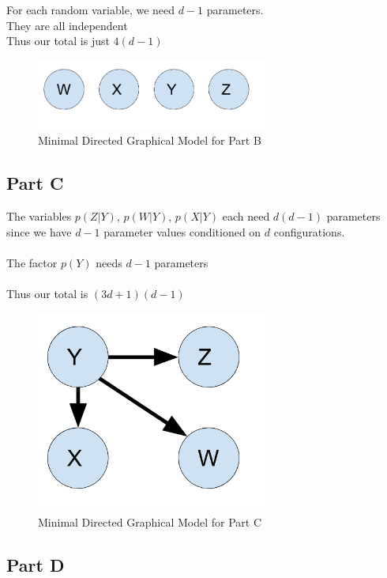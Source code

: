 \documentclass[twoside,11pt]{article}
\theoremstyle{definition}
\begin{document}
For each random variable, we need $d-1$ parameters. \\
They are all independent\\
Thus our total is just $4(d-1)$
\begin{figure}[h]
\centering
\includegraphics[width=3in]{HW1_Prob1_partB.png}
\caption{Minimal Directed Graphical Model for Part B}
\end{figure}

\subsection*{Part C}

The variables $p(Z|Y)$, $p(W|Y)$, $p(X|Y)$ each need $d(d-1)$ parameters since we have $d-1$ parameter values conditioned on $d$ configurations.\\
\\
The factor $p(Y)$ needs $d-1$ parameters\\
\\
Thus our total is $(3d+1)(d-1)$
\begin{figure}[h]
\centering
\includegraphics[width=3in]{HW1_Prob1_partC.png}
\caption{Minimal Directed Graphical Model for Part C}
\end{figure}

\newpage

\subsection*{Part D}
\end{document}
